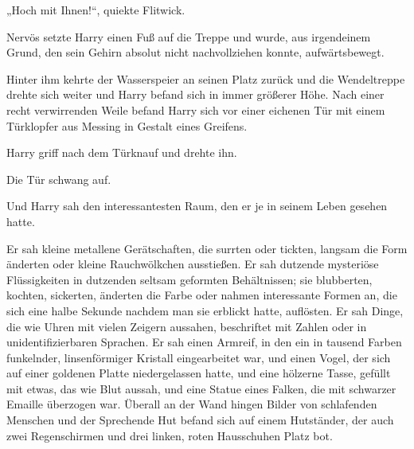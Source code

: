 „Hoch mit Ihnen!“, quiekte Flitwick.

Nervös setzte Harry einen Fuß auf die Treppe und wurde, aus irgendeinem Grund, den sein Gehirn absolut nicht nachvollziehen konnte, aufwärtsbewegt.

Hinter ihm kehrte der Wasserspeier an seinen Platz zurück und die Wendeltreppe drehte sich weiter und Harry befand sich in immer größerer Höhe. Nach einer recht verwirrenden Weile befand Harry sich vor einer eichenen Tür mit einem Türklopfer aus Messing in Gestalt eines Greifens.

Harry griff nach dem Türknauf und drehte ihn.

Die Tür schwang auf.

Und Harry sah den interessantesten Raum, den er je in seinem Leben gesehen hatte.

Er sah kleine metallene Gerätschaften, die surrten oder tickten, langsam die Form änderten oder kleine Rauchwölkchen ausstießen. Er sah dutzende mysteriöse Flüssigkeiten in dutzenden seltsam geformten Behältnissen; sie blubberten, kochten, sickerten, änderten die Farbe oder nahmen interessante Formen an, die sich eine halbe Sekunde nachdem man sie erblickt hatte, auflösten. Er sah Dinge, die wie Uhren mit vielen Zeigern aussahen, beschriftet mit Zahlen oder in unidentifizierbaren Sprachen. Er sah einen Armreif, in den ein in tausend Farben funkelnder, linsenförmiger Kristall eingearbeitet war, und einen Vogel, der sich auf einer goldenen Platte niedergelassen hatte, und eine hölzerne Tasse, gefüllt mit etwas, das wie Blut aussah, und eine Statue eines Falken, die mit schwarzer Emaille überzogen war. Überall an der Wand hingen Bilder von schlafenden Menschen und der Sprechende Hut befand sich auf einem Hutständer, der auch zwei Regenschirmen und drei linken, roten Hausschuhen Platz bot.

